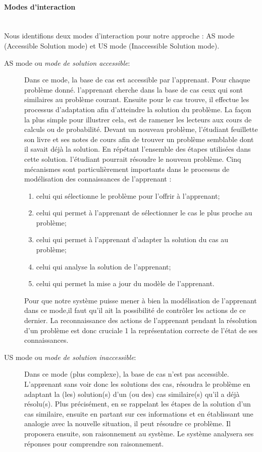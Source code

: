 \paragraph{Modes d'interaction}\mbox{}\\
Nous identifions deux modes d'interaction pour notre approche :
AS mode (Accessible Solution mode) et US mode (Inaccessible Solution mode).
\begin{description}
    \item[AS mode ou \textit{mode de solution accessible}:] Dans ce mode, la base de cas est accessible par l'apprenant. Pour chaque problème donné. l'apprenant cherche dans la base de cas ceux qui sont similaires au problème courant. Ensuite pour le cas trouve, il effectue les processus d'adaptation afin d'atteindre la solution du problème.
    La façon la plus simple pour illustrer cela, est de ramener les lecteurs aux cours de calculs ou de probabilité. Devant un nouveau problème, l'étudiant feuillette son livre et ses notes de cours afin de trouver un problème semblable dont il savait déjà la  solution. En répétant l'ensemble des étapes utilisées dans cette solution. l'étudiant pourrait résoudre le nouveau problème.
    Cinq mécanismes sont particulièrement importants dans le processus de modélisation
    des connaissances de l'apprenant :
    \begin{enumerate}
        \item celui qui sélectionne le problème pour l'offrir à l'apprenant;
        \item celui qui permet à l'apprenant de sélectionner le cas le plus proche au problème;
        \item celui qui permet à l'apprenant d'adapter la solution du cas au problème;
        \item celui qui analyse la solution de l'apprenant;
        \item celui qui permet la mise a jour du modèle de l'apprenant.
    \end{enumerate}
    Pour que notre système puisse mener à bien la modélisation de l'apprenant dans ce mode,il faut qu'il ait la possibilité de contrôler les actions de ce dernier. La reconnaissance des actions de l'apprenant pendant la résolution d'un problème est donc cruciale 1 la représentation correcte de l'état de ses connaissances. 
\end{description}    

\begin{description}
    \item[US mode ou \textit{mode de solution inaccessible}:] Dans ce mode (plus complexe), la base de cas n'est pas accessible. L'apprenant sans voir donc les solutions des cas, résoudra le problème en adaptant la (les) solution(s) d'un (ou des) cas similaire(s) qu'il a déjà résolu(s). Plus précisément, en se rappelant les étapes de la solution d'un cas similaire, ensuite en partant sur ces informations et en établissant une analogie avec la nouvelle situation, il peut résoudre ce problème. Il proposera ensuite, son raisonnement au système. Le système analysera ses réponses pour comprendre son raisonnement.
\end{description}


